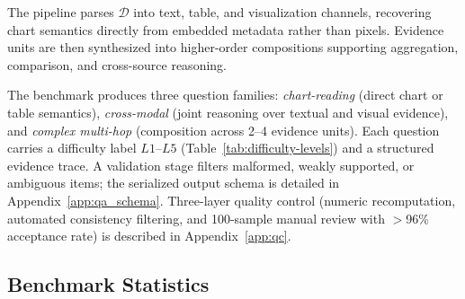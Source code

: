 The pipeline parses $\mathcal{D}$ into text, table, and visualization channels, recovering chart semantics directly from embedded metadata rather than pixels. Evidence units are then synthesized into higher-order compositions supporting aggregation, comparison, and cross-source reasoning.

The benchmark produces three question families: \emph{chart-reading} (direct chart or table semantics), \emph{cross-modal} (joint reasoning over textual and visual evidence), and \emph{complex multi-hop} (composition across 2--4 evidence units). Each question carries a difficulty label $L1$--$L5$ (Table~\ref{tab:difficulty-levels}) and a structured evidence trace. A validation stage filters malformed, weakly supported, or ambiguous items; the serialized output schema is detailed in Appendix~\ref{app:qa_schema}. Three-layer quality control (numeric recomputation, automated consistency filtering, and 100-sample manual review with $>$96\% acceptance rate) is described in Appendix~\ref{app:qc}.

\subsection{Benchmark Statistics}
\label{app:doc_stats}


\begin{table}
  \centering
  \label{tab:doc_stats}
  \small
  \caption{Per-document statistics across all 200 reports.}
\end{table}


